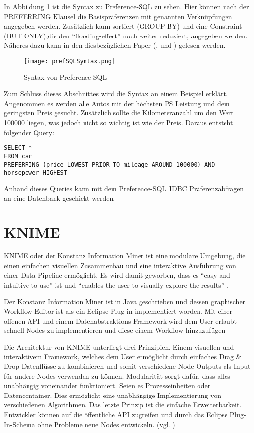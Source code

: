 In Abbildung \ref{img:prefSQLSyntax} ist die Syntax zu Preference-SQL zu sehen. Hier können nach der PREFERRING Klausel die Basispräferenzen mit genannten Verknüpfungen angegeben werden. Zusätzlich kann sortiert (GROUP BY) und eine Constraint (BUT ONLY),die den \enquote{flooding-effect} noch weiter reduziert, angegeben werden. Näheres dazu kann in den diesbezüglichen Paper (\cite{kiessling2011preference}, \cite{kiessling2002foundations} und \cite{kiessling2002preference}) gelesen werden.

\begin{figure}[H]
	\centering
	\texttt{[image: prefSQLSyntax.png]}
	\caption{Syntax von Preference-SQL}
	\label{img:prefSQLSyntax}
\end{figure} 

Zum Schluss dieses Abschnittes wird die Syntax an einem Beispiel erklärt.
Angenommen es werden alle Autos mit der höchsten PS Leistung und dem geringsten Preis gesucht. Zusätzlich sollte die Kilometeranzahl um den Wert 100000 liegen, was jedoch nicht so wichtig ist wie der Preis.
Daraus entsteht folgender Query:
\begin{verbatim}
SELECT * 
FROM car 
PREFERRING (price LOWEST PRIOR TO mileage AROUND 100000) AND
horsepower HIGHEST
\end{verbatim}


Anhand dieses Queries kann mit dem Preference-SQL JDBC Präferenzabfragen an eine Datenbank geschickt werden.
\section{KNIME}
\label{ch:Grundlagen:sec:knime}
KNIME oder der Konstanz Information Miner ist eine modulare Umgebung, die einen einfachen visuellen Zusammenbau und eine interaktive Ausführung von einer Data Pipeline ermöglicht. Es wird damit geworben, dass es \enquote{easy and intuitive to use} ist und \enquote{enables the user to visually explore the results} \cite[p. 2]{BCDG+07}. 

Der Konstanz Information Miner ist in Java geschrieben und dessen graphischer Workflow Editor ist als ein Eclipse Plug-in implementiert worden. Mit einer offenen API und einem Datenabstraktions Framework wird dem User erlaubt schnell Nodes zu implementieren und diese einem Workflow hinzuzufügen.

Die Architektur von KNIME unterliegt drei Prinzipien. Einem visuellen und interaktivem Framework, welches dem User ermöglicht durch einfaches Drag \& Drop Datenflüsse zu kombinieren und somit verschiedene Node Outputs als Input für andere Nodes verwenden zu können. Modularität sorgt dafür, dass alles unabhängig voneinander funktioniert. Seien es Prozesseinheiten oder Datencontainer. Dies ermöglicht eine unabhängige Implementierung von verschiedenen Algorithmen. Das letzte Prinzip ist die einfache Erweiterbarkeit. Entwickler können auf die öffentliche API zugreifen und durch das Eclipse Plug-In-Schema ohne Probleme neue Nodes entwickeln. (vgl. \cite{BCDG+07})

